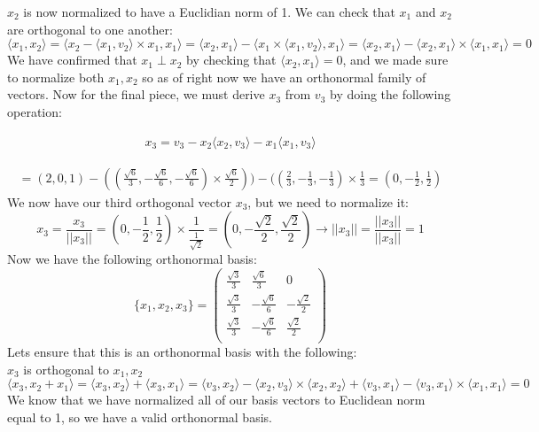 \documentclass[12pt,twoside]{article}
\begin{document}
$x_2$ is now normalized to have a Euclidian norm of 1. We can check that $x_1$ and $x_2$ are orthogonal to one another:
$$
    \langle x_1, x_2\rangle = \langle x_2 - \langle x_1,v_2\rangle \times x_1 , x_1 \rangle = \langle x_2, x_1 \rangle - \langle x_1 \times \langle x_1, v_2 \rangle, x_1 \rangle = \langle x_2,x_1 \rangle - \langle x_2,x_1 \rangle \times \langle x_1, x_1 \rangle = 0 
$$
We have confirmed that $x_1 \perp x_2$ by checking that $\langle x_2,x_1 \rangle = 0$, and we made sure to normalize both $x_1,x_2$ so as of right now we have an orthonormal family of vectors. Now for the final piece, we must derive $x_3$ from $v_3$ by doing the following operation:

\begin{equation}
    \begin{split}
    x_3 = v_3 - x_2 \langle x_2, v_3\rangle - x_1 \langle x_1, v_3 \rangle 
    \end{split}
\end{equation}

\begin{equation}
    \begin{split}
         = (2,0,1) - ((\frac{\sqrt{6}}{3},- \frac{\sqrt{6}}{6}, - \frac{\sqrt{6}}{6}) \times \frac{\sqrt{6}}{2})) - ((\frac{2}{3},-\frac{1}{3},-\frac{1}{3}) \times \frac{1}{3} = (0, -\frac{1}{2}, \frac{1}{2})
    \end{split}
\end{equation}
We now have our third orthogonal vector $x_3$, but we need to normalize it:
$$
    x_3 = \frac{x_3}{||x_3||} =  (0, -\frac{1}{2}, \frac{1}{2}) \times  \frac{1}{\frac{1}{\sqrt{2}}} = (0, -\frac{\sqrt{2}}{2}, \frac{\sqrt{2}}{2}) \rightarrow ||x_3|| = \frac{||x_3||}{||x_3||} = 1
$$
Now we have the following orthonormal basis: 
$$\{x_1,x_2,x_3 \} = \begin{pmatrix}
\frac{\sqrt{3}}{3} & \frac{\sqrt{6}}{3} & 0 \\
\frac{\sqrt{3}}{3} & -\frac{\sqrt{6}}{6} & -\frac{\sqrt{2}}{2}\\
\frac{\sqrt{3}}{3} & -\frac{\sqrt{6}}{6} & \frac{\sqrt{2}}{2} \\
\end{pmatrix}$$
Lets ensure that this is an orthonormal basis with the following:\\
$x_3$ is orthogonal to $x_1, x_2$
$$
    \langle x_3,x_2 + x_1 \rangle = \langle x_3, x_2 \rangle + \langle x_3, x_1 \rangle = \langle v_3, x_2 \rangle - \langle x_2, v_3 \rangle \times \langle x_2, x_2 \rangle + \langle v_3, x_1 \rangle - \langle v_3, x_1 \rangle \times \langle x_1, x_1 \rangle = 0
$$
We know that we have normalized all of our basis vectors to Euclidean norm equal to 1, so we have a valid orthonormal basis.\\
\end{document}
